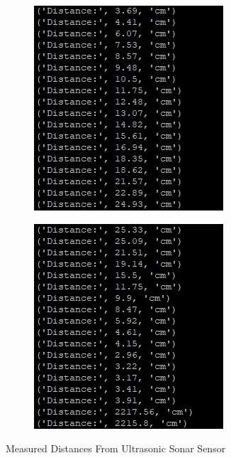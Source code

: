 \begin{itemize}
\begin{figure}[ht]
     \centering
     \begin{subfigure}[b]{0.49\textwidth}
     \includegraphics[width=\linewidth]{img/sonardistance-1.jpg}
     \label{fig:sonar1}
     \end{subfigure}
     \begin{subfigure}[b]{0.49\textwidth}
     \includegraphics[width=\linewidth]{img/sonardistance-2.jpg}
     \label{fig:sonar2}
     \end{subfigure}        
     \caption{Measured Distances From Ultrasonic Sonar Sensor}
     \label{fig:sonardist}
\end{figure}



\end{itemize}
